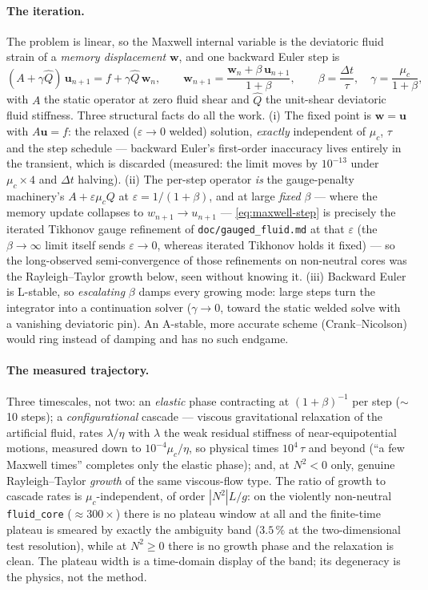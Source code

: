 \documentclass[11pt]{article}
\newcommand{\eps}{\varepsilon}
\newcommand{\bu}{\mathbf{u}}
\newcommand{\bw}{\mathbf{w}}
\newcommand{\code}[1]{\texttt{#1}}
\begin{document}
\paragraph{The iteration.} The problem is linear, so the Maxwell
internal variable is the deviatoric fluid strain of a \emph{memory
displacement} $\bw$, and one backward Euler step is
\begin{equation}
  (A + \gamma \hat Q)\,\bu_{n+1} = f + \gamma \hat Q\,\bw_n,
  \qquad
  \bw_{n+1} = \frac{\bw_n + \beta\,\bu_{n+1}}{1+\beta},
  \qquad
  \beta = \frac{\Delta t}{\tau},\quad
  \gamma = \frac{\mu_c}{1+\beta},
  \label{eq:maxwell-step}
\end{equation}
with $A$ the static operator at zero fluid shear and $\hat Q$ the
unit-shear deviatoric fluid stiffness. Three structural facts do all
the work. (i) The fixed point is $\bw = \bu$ with $A\bu = f$: the
relaxed ($\eps \to 0$ welded) solution, \emph{exactly} independent of
$\mu_c$, $\tau$ and the step schedule --- backward Euler's first-order
inaccuracy lives entirely in the transient, which is discarded
(measured: the limit moves by $10^{-13}$ under $\mu_c \times 4$ and
$\Delta t$ halving). (ii) The per-step operator \emph{is} the
gauge-penalty machinery's $A + \eps\mu_c Q$ at
$\eps = 1/(1+\beta)$, and at large \emph{fixed} $\beta$ --- where the
memory update collapses to $w_{n+1} \to u_{n+1}$ ---
\eqref{eq:maxwell-step} is precisely the iterated Tikhonov gauge
refinement of \code{doc/gauged\_fluid.md} at that $\eps$ (the
$\beta \to \infty$ limit itself sends $\eps \to 0$, whereas iterated
Tikhonov holds it fixed) --- so the long-observed
semi-convergence of those refinements on non-neutral cores was the
Rayleigh--Taylor growth below, seen without knowing it. (iii)
Backward Euler is L-stable, so \emph{escalating} $\beta$ damps every
growing mode: large steps turn the integrator into a continuation
solver ($\gamma \to 0$, toward the static welded solve with a
vanishing deviatoric pin). An A-stable, more accurate scheme
(Crank--Nicolson) would ring instead of damping and has no such
endgame.

\paragraph{The measured trajectory.} Three timescales, not two:
an \emph{elastic} phase contracting at $(1+\beta)^{-1}$ per step
($\sim$10 steps); a \emph{configurational} cascade --- viscous
gravitational relaxation of the artificial fluid, rates
$\lambda/\eta$ with $\lambda$ the weak residual stiffness of
near-equipotential motions, measured down to $10^{-4}\mu_c/\eta$, so
physical times $10^4\,\tau$ and beyond (``a few Maxwell times''
completes only the elastic phase); and, at $N^2 < 0$ only, genuine
Rayleigh--Taylor \emph{growth} of the same viscous-flow type. The
ratio of growth to cascade rates is $\mu_c$-independent, of order
$|N^2|L/g$: on the violently non-neutral \code{fluid\_core}
($\approx 300\times$) there is no plateau window at all and the
finite-time plateau is smeared by exactly the ambiguity band
($3.5\,\%$ at the two-dimensional test resolution), while at
$N^2 \ge 0$ there is no growth phase and the relaxation is clean.
The plateau width is a time-domain display of the band; its
degeneracy is the physics, not the method.
\end{document}
